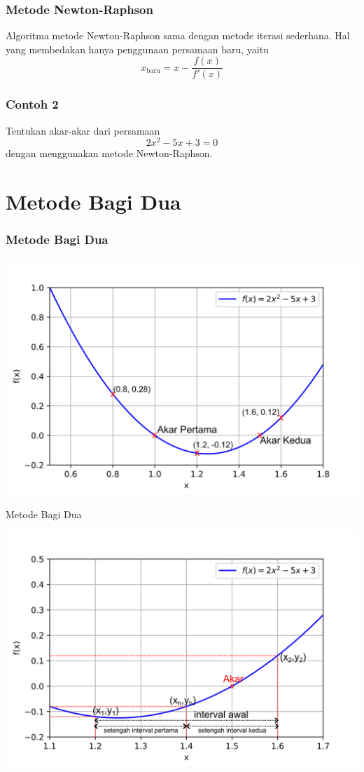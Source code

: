 \documentclass[pdflatex,compress,mathserif]{beamer}
\begin{document}
\begin{frame}
	\frametitle{Metode Newton-Raphson}
	Algoritma metode Newton-Raphson sama dengan metode iterasi sederhana. Hal yang membedakan hanya penggunaan persamaan baru, yaitu $$ x_{\text{baru}} = x - \frac{f(x)}{f'(x)} $$
\end{frame}

\begin{frame}
	\frametitle{Contoh 2}
	Tentukan akar-akar dari persamaan $$ 2x^2 - 5x + 3 = 0 $$ dengan menggunakan metode Newton-Raphson.
\end{frame}

\section{Metode Bagi Dua}

\begin{frame}
	\frametitle{Metode Bagi Dua}
	\begin{center}
		\includegraphics[width=\linewidth]{img/01}
	\end{center}
\end{frame}

\begin{frame}{Metode Bagi Dua}
	\begin{center}
		\includegraphics[width=\linewidth]{img/02}
	\end{center}
\end{frame}
\end{document}
